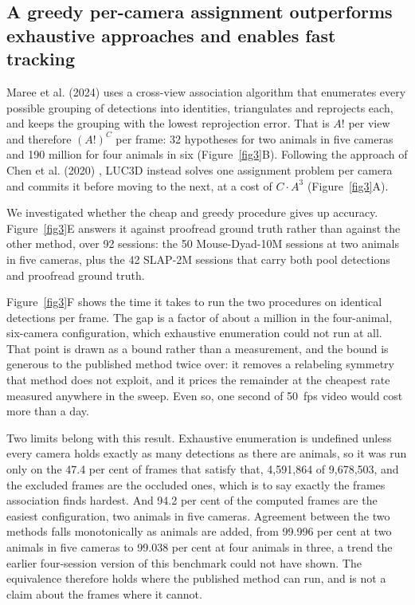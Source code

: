 \documentclass[pdflatex, sn-nature]{sn-jnl}
\theoremstyle{thmstyleone}%
\theoremstyle{thmstyletwo}%
\theoremstyle{thmstylethree}%
\begin{document}
\subsection{A greedy per-camera assignment outperforms exhaustive approaches and enables fast tracking}\label{subsec2-3}

Maree et al. (2024) \citep{Maree2024} uses a cross-view association algorithm that enumerates every possible grouping of detections into identities, triangulates and reprojects each, and keeps the grouping with the lowest reprojection error. That is $A!$ per view and therefore $(A!)^C$ per frame: 32 hypotheses for two animals in five cameras and 190 million for four animals in six (Figure~\ref{fig3}B). Following the approach of Chen et al. (2020) \citep{Chen2020}, LUC3D instead solves one assignment problem per camera and commits it before moving to the next, at a cost of $C \cdot A^3$ (Figure~\ref{fig3}A).

We investigated whether the cheap and greedy procedure gives up accuracy. Figure~\ref{fig3}E answers it against proofread ground truth rather than against the other method, over 92 sessions: the 50 Mouse-Dyad-10M sessions at two animals in five cameras, plus the 42 SLAP-2M sessions that carry both pool detections and proofread ground truth. 

Figure~\ref{fig3}F shows the time it takes to run the two procedures on identical detections per frame. The gap is a factor of about a million in the four-animal, six-camera configuration, which exhaustive enumeration could not run at all. That point is drawn as a bound rather than a measurement, and the bound is generous to the published method twice over: it removes a relabeling symmetry that method does not exploit, and it prices the remainder at the cheapest rate measured anywhere in the sweep. Even so, one second of 50~fps video would cost more than a day.

Two limits belong with this result. Exhaustive enumeration is undefined unless every camera holds exactly as many detections as there are animals, so it was run only on the 47.4 per cent of frames that satisfy that, 4,591,864 of 9,678,503, and the excluded frames are the occluded ones, which is to say exactly the frames association finds hardest. And 94.2 per cent of the computed frames are the easiest configuration, two animals in five cameras. Agreement between the two methods falls monotonically as animals are added, from 99.996 per cent at two animals in five cameras to 99.038 per cent at four animals in three, a trend the earlier four-session version of this benchmark could not have shown. The equivalence therefore holds where the published method can run, and is not a claim about the frames where it cannot.
\end{document}
